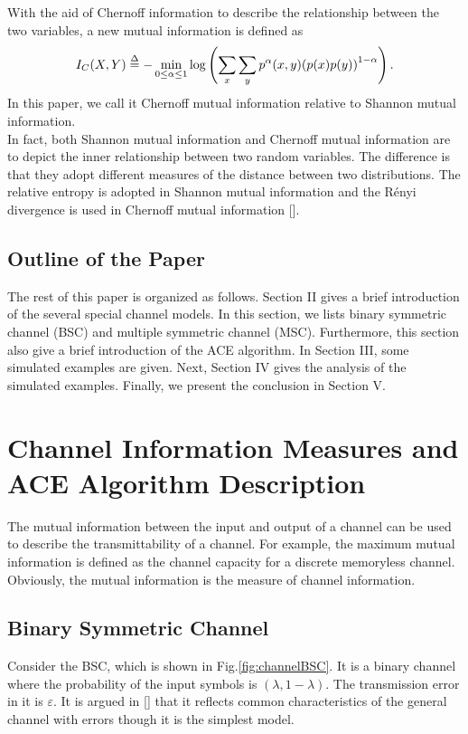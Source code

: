 \documentclass[conference]{IEEEtran}
\begin{document}
With the aid of Chernoff information to describe the relationship between the two variables, a new mutual information is defined as
\begin{equation}\label{Chernoff Information2}
\begin{aligned}
  I_C(X,Y) \buildrel \Delta \over =  - \mathop {\min }\limits_{0 \le \alpha  \le 1} \log \left( {\sum\limits_x {\sum\limits_y {{p^\alpha }(x,y){{(p(x)p(y))}^{1 - \alpha }}} } } \right).
 \end{aligned}
\end{equation}
In this paper, we call it Chernoff mutual information relative to Shannon mutual information. \\
In fact, both Shannon mutual information and Chernoff mutual information are  to depict the inner relationship between two random variables. The difference is that they adopt different measures of the distance between two distributions. The relative entropy is adopted in Shannon mutual information and the R{\'{e}}nyi divergence is used in Chernoff mutual information [\cite{van2014renyi}].

\subsection{Outline of the Paper}
The rest of this paper is organized as follows. Section II gives a brief introduction of the several special channel models. In this section, we lists binary symmetric channel (BSC) and multiple symmetric channel (MSC). Furthermore, this section also give a brief introduction of the ACE algorithm. In Section III, some simulated examples are given. Next, Section IV gives the analysis of the simulated examples. Finally, we present the conclusion in Section V.

\section{Channel Information Measures and ACE Algorithm Description}
The mutual information between the input and output of a channel can be used to describe the transmittability of a channel. For example, the maximum mutual information is defined as the channel capacity for a discrete memoryless channel. Obviously, the mutual information is the measure of channel information.\\

\subsection{Binary Symmetric Channel}
Consider the BSC, which is shown in Fig.\ref{fig:channelBSC}. It is a binary channel where the probability of the input symbols is $(\lambda,1-\lambda)$. The transmission error in it is $\varepsilon $. It is argued in [\cite{Elements}] that it reflects common characteristics of the general channel with errors though it is the simplest model.\\
\end{document}
